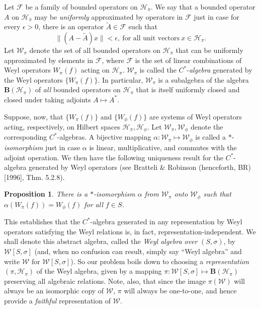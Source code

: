 \documentclass[12pt]{article}
\newtheorem{prop}{Proposition}
\theoremstyle{remark}
\theoremstyle{definition}
\newcommand{\alg}[1]{\mathcal{#1}}
\newcommand{\norm}[1]{\| #1\|}
\newcommand{\hil}[1]{\mathcal{#1}}
\begin{document}
Let $\alg{F}$ be a family of bounded operators on $\hil{H}_{\pi}$.  We
say that a bounded operator $A$ on $\hil{H}_{\pi}$ may be 
\emph{uniformly}
  approximated by operators in $\alg{F}$ just in case for every
$\epsilon >0$, there is an operator $\tilde{A}\in \alg{F}$ such that
\begin{equation}
\norm{(A-\tilde{A})x}<\epsilon ,\ \mbox{for all unit vectors}\ 
x\in \hil{H}_{\pi}. \label{uniform} \end{equation} 
  Let $\alg{W}_{\pi}$ 
denote the set of all bounded operators on $\hil{H}_{\pi}$ that can be uniformly
approximated by elements in $\alg{F}$, where $\alg{F}$ is the set of
linear combinations of Weyl operators $W_{\pi}(f)$ acting on
$\hil{H}_{\pi}$.  $\alg{W}_{\pi}$ is called the $C^{*}$-\emph{algebra}
generated by the Weyl operators $\{ W_{\pi}(f)\}$.  In particular, 
$\alg{W}_{\pi}$ is a subalgebra of the algebra 
$\mathbf{B}(\hil{H}_{\pi})$ of \emph{all} bounded operators on
$\hil{H}_{\pi}$ that is itself uniformly closed and closed under taking adjoints
$A\mapsto A^{*}$.        

Suppose, now, that $\{ W_{\pi}(f)\}$ and $\{ W_{\phi}(f)\}$ are systems
of Weyl operators acting, respectively, on Hilbert spaces
$\hil{H}_{\pi},\hil{H}_{\phi}$.  Let $\alg{W}_{\pi},\alg{W}_{\phi}$
denote the corresponding $C^{*}$-algebras.  A bijective mapping
$\alpha :\alg{W}_{\pi}\mapsto \alg{W}_{\phi}$ is called a
$*$-\emph{isomorphism} just in case $\alpha$ is linear,
multiplicative, and commutes with the adjoint operation.  We then have
the following uniqueness result for the $C^{*}$-algebra generated by
Weyl operators (see Bratteli \& Robinson (henceforth, BR)
[1996], Thm. 5.2.8).

\begin{prop} There is a $*$-isomorphism $\alpha$ from $\alg{W}_{\pi}$ onto
  $\alg{W}_{\phi}$ such that $\alpha (W_{\pi}(f))=W_{\phi}(f)$ for all
  $f\in S$.  \end{prop}

\noindent This establishes that the $C^{*}$-algebra generated in any 
representation by Weyl operators satisfying the Weyl relations is, in 
fact, 
representation-independent.  We shall denote this abstract algebra, 
called the \emph{Weyl
  algebra over} $(S,\sigma)$, by $\alg{W}[S,\sigma]$ 
  (and, when no confusion
can result, simply say ``Weyl algebra'' and write $\alg{W}$ for 
$\alg{W}[S,\sigma ]$).  
So our problem boils down to choosing a 
\emph{representation} $(\pi ,\hil{H}_{\pi})$ of the Weyl algebra, 
given by a mapping $\pi:\alg{W}[S,\sigma ]\mapsto\mathbf{B}(\hil{H}_{\pi})$ 
preserving all algebraic relations. Note, also, 
that 
since the image $\pi(\alg{W})$ will always be an isomorphic copy of 
$\alg{W}$, $\pi$ will always be one-to-one, and hence provide a  
\emph{faithful} representation of $\alg{W}$.   
\end{document}
